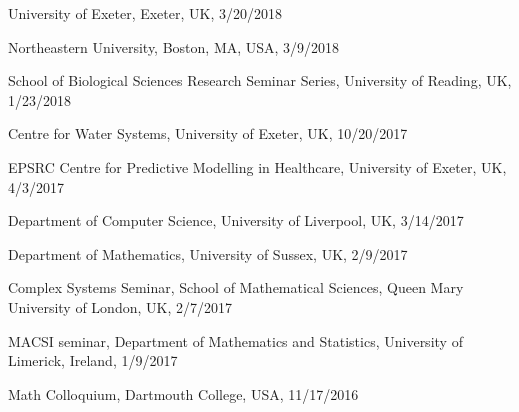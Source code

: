 \documentclass[11pt,letter]{article}
\renewenvironment{itemize}{
  \begin{list}{}{
    \setlength{\leftmargin}{1.5em}
    \setlength{\itemsep}{0.25em}
    \setlength{\parskip}{0pt}
    \setlength{\parsep}{0.25em}
  }
}{
  \end{list}
}
\begin{document}
\begin{itemize}
University of Exeter, Exeter, UK, 3/20/2018

Northeastern University, Boston, MA, USA, 3/9/2018


\item
School of Biological Sciences Research Seminar Series, University of Reading, UK, 1/23/2018

\item
Centre for Water Systems, University of Exeter, UK, 10/20/2017

\item
EPSRC Centre for Predictive Modelling in Healthcare, University of Exeter, UK, 4/3/2017

\item
Department of Computer Science, University of Liverpool, UK, 3/14/2017

\item
Department of Mathematics, University of Sussex, UK, 2/9/2017

\item
Complex Systems Seminar, School of Mathematical Sciences, Queen Mary University of London, UK, 2/7/2017

\item
MACSI seminar, Department of Mathematics and Statistics, University of Limerick, Ireland, 1/9/2017

\item
Math Colloquium, Dartmouth College, USA, 11/17/2016


\end{itemize}
\end{document}
